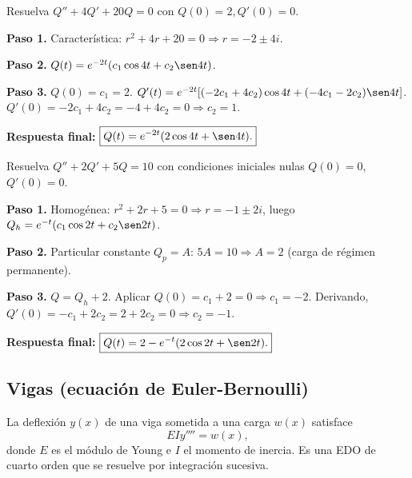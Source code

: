 \begin{example}
Resuelva $Q'' + 4Q' + 20Q = 0$ con $Q(0)=2, Q'(0)=0$.

\begin{myproof}
\textbf{Paso 1.} Característica: $r^2+4r+20=0 \Rightarrow r = -2 \pm 4i$.

\textbf{Paso 2.} $Q(t) = e^{-2t}(c_1 \cos 4t + c_2 \sen 4t)$.

\textbf{Paso 3.} $Q(0)=c_1=2$. $Q'(t)=e^{-2t}[(-2c_1+4c_2)\cos 4t + (-4c_1-2c_2)\sen 4t]$. $Q'(0)=-2c_1+4c_2 = -4+4c_2=0 \Rightarrow c_2=1$.

\textbf{Respuesta final:} $\boxed{Q(t) = e^{-2t}(2\cos 4t + \sen 4t).}$
\end{myproof}
\end{example}

\begin{example}
Resuelva $Q''+2Q'+5Q=10$ con condiciones iniciales nulas $Q(0)=0$, $Q'(0)=0$.

\begin{myproof}
\textbf{Paso 1.} Homogénea: $r^2+2r+5=0 \Rightarrow r=-1\pm 2i$, luego $Q_h=e^{-t}(c_1\cos 2t+c_2\sen 2t)$.

\textbf{Paso 2.} Particular constante $Q_p=A$: $5A=10\Rightarrow A=2$ (carga de régimen permanente).

\textbf{Paso 3.} $Q=Q_h+2$. Aplicar $Q(0)=c_1+2=0\Rightarrow c_1=-2$. Derivando, $Q'(0)=-c_1+2c_2=2+2c_2=0\Rightarrow c_2=-1$.

\textbf{Respuesta final:} $\boxed{Q(t)=2-e^{-t}(2\cos 2t+\sen 2t).}$
\end{myproof}
\end{example}

\subsection{Vigas (ecuación de Euler-Bernoulli)}

La deflexión $y(x)$ de una viga sometida a una carga $w(x)$ satisface
\[
EI y'''' = w(x),
\]
donde $E$ es el módulo de Young e $I$ el momento de inercia. Es una EDO de cuarto orden que se resuelve por integración sucesiva.

